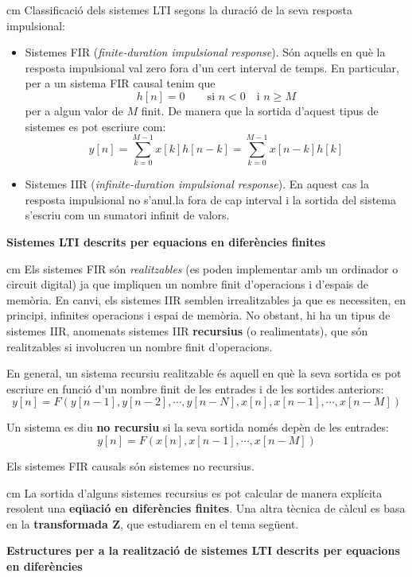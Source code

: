 \documentclass{article}
\begin{document}
 cm
\noindent
Classificaci\'o dels sistemes LTI segons la duraci\'o de la seva resposta impulsional:
\begin{itemize}
\item Sistemes FIR (\textit{finite-duration impulsional response}).
S\'on aquells en qu\`e la resposta impulsional val zero fora d'un cert
interval de temps. En particular, per a un sistema FIR causal tenim que
\[
h[n]=0 \qquad \text{si } n < 0 \quad \text{i } n \geq M
\]
\noindent
per a algun valor de $M$ finit. De manera que la sortida d'aquest tipus de
sistemes es pot escriure com:
\[
y[n]=\sum_{k=0}^{M-1} x[k] h[n-k]=\sum_{k=0}^{M-1} x[n-k] h[k]
\]

\item Sistemes IIR (\textit{infinite-duration impulsional response}).
En aquest cas la resposta impulsional no s'anul.la fora de cap interval i
la sortida del sistema s'escriu com un sumatori infinit de valors.
\end{itemize}


\noindent
\textbf{Sistemes LTI descrits per equacions en difer\`encies finites}

 cm
\noindent
Els sistemes FIR s\'on \textit{realitzables} (es poden implementar amb un ordinador o circuit 
digital) ja que impliquen un nombre finit d'operacions i d'espais de mem\`oria.
En canvi, els sistemes IIR semblen irrealitzables ja que es necessiten, en principi,
infinites operacions i espai de mem\`oria. No obstant, hi ha un tipus de sistemes IIR, 
anomenats sistemes IIR \textbf{recursius} (o realimentats), que s\'on realitzables si involucren un nombre finit 
d'operacions.

En general, un sistema recursiu realitzable \'es aquell en qu\`e la seva sortida es pot escriure en funci\'o
d'un nombre finit de les entrades i de les sortides anteriors:
\[
y[n]=F( y[n-1], y[n-2], \cdots, y[n-N], x[n], x[n-1], \cdots, x[n-M]  )
\]

Un sistema es diu \textbf{no recursiu} si la seva sortida nom\'es dep\`en de les
entrades:
\[
y[n]=F( x[n], x[n-1], \cdots, x[n-M]  )
\]

Els sistemes FIR causals s\'on sistemes no recursius.


 cm
La sortida d'alguns sistemes recursius es pot calcular de manera explícita resolent
una \textbf{eqüació en diferències finites}. Una altra tècnica de càlcul es basa en la
\textbf{transformada Z}, que estudiarem en el tema següent.  


\vskip 0.4cm
\noindent
\textbf{Estructures per a la realitzaci\'o de sistemes LTI descrits per equacions en diferències} 
\end{document}
